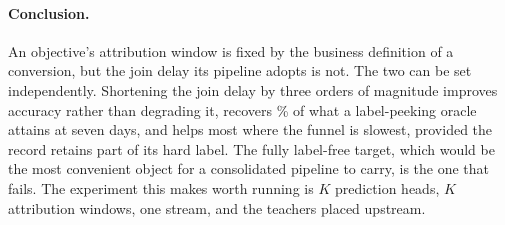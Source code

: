 \paragraph{Conclusion.} An objective's attribution window is fixed by the business definition of
a conversion, but the join delay its pipeline adopts is not. The two can be set independently.
Shortening the join delay by three orders of magnitude improves accuracy rather than degrading
it, recovers \recoverSeven{}\% of what a label-peeking oracle attains at seven days, and helps
most where the funnel is slowest, provided the record retains part of its hard label. The fully
label-free target, which would be the most convenient object for a consolidated pipeline to
carry, is the one that fails. The experiment this makes worth running is $K$ prediction heads,
$K$ attribution windows, one stream, and the teachers placed upstream.
